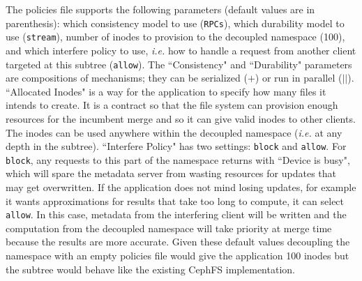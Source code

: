 The policies file supports the following parameters (default values are in
parenthesis): which consistency model to use (\texttt{RPCs}), which durability
model to use (\texttt{stream}), number of inodes to provision to the decoupled
namespace (100), and which interfere policy to use, {\it i.e.} how to handle a
request from another client targeted at this subtree (\texttt{allow}). The
``Consistency" and ``Durability" parameters are compositions of mechanisms;
they can be serialized (\(+\)) or run in parallel (\(||\)).  ``Allocated
Inodes" is a way for the application to specify how many files it intends to
create. It is a contract so that the file system can provision enough resources
for the incumbent merge and so it can give valid inodes to other clients. The
inodes can be used anywhere within the decoupled namespace ({\it i.e.} at any
depth in the subtree).  ``Interfere Policy" has two settings: \texttt{block}
and \texttt{allow}.  For \texttt{block}, any requests to this part of the
namespace returns with ``Device is busy", which will spare the metadata server
from wasting resources for updates that may get overwritten. If the application
does not mind losing updates, for example it wants approximations for results
that take too long to compute, it can select \texttt{allow}. In this case,
metadata from the interfering client will be written and the computation from
the decoupled namespace will take priority at merge time because the results
are more accurate.  Given these default values decoupling the namespace with an
empty policies file would give the application 100 inodes but the subtree would
behave like the existing CephFS implementation.  
